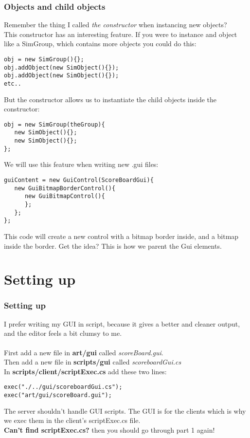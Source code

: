 \begin{frame}[fragile]
\frametitle{Objects and child objects}
Remember the thing I called {\it the constructor} when instancing new objects?\\
This constructor has an interesting feature. If you were to instance and object like a SimGroup, which contains more objects you could do this:\\
\TS
\begin{lstlisting}
obj = new SimGroup(){};
obj.addObject(new SimObject(){});
obj.addObject(new SimObject(){});
etc..
\end{lstlisting}
But the constructor allows us to instantiate the child objects inside the constructor:\\
\begin{lstlisting}
obj = new SimGroup(theGroup){
   new SimObject(){};
   new SimObject(){};
};
\end{lstlisting}
We will use this feature when writing new .gui files:\\
\begin{lstlisting}
guiContent = new GuiControl(ScoreBoardGui){
   new GuiBitmapBorderControl(){
      new GuiBitmapControl(){
      };
   };
};
\end{lstlisting}
This code will create a new control with a bitmap border inside, and a bitmap inside the border. Get the idea? This is how we parent the Gui elements.
\end{frame}

\section{Setting up}
\begin{frame}[fragile]
\frametitle{Setting up}
I prefer writing my GUI in script, because it gives a better and cleaner output, and the editor feels a bit clumsy to me.\\
\\
First add a new file in {\bf art/gui} called {\it scoreBoard.gui}.\\
Then add a new file in {\bf scripts/gui} called {\it scoreboardGui.cs}\\
In {\bf scripts/client/scriptExec.cs} add these two lines:
\TS
\begin{lstlisting}
exec("./../gui/scoreboardGui.cs");
exec("art/gui/scoreBoard.gui");
\end{lstlisting}
The server shouldn't handle GUI scripts. The GUI is for the clients which is why we exec them in the client's scriptExec.cs file.\\
{\bf Can't find scriptExec.cs?} then you should go through part 1 again!
\end{frame}

